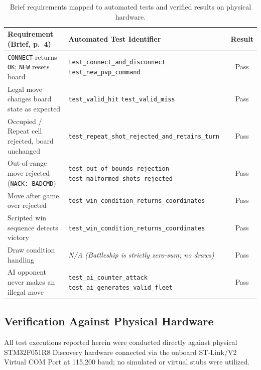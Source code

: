 \begin{table}[t]
\centering
\caption{Brief requirements mapped to automated tests and verified results on physical hardware.}
\label{tab:required}
\scriptsize
\begin{tabular}{@{}L{3.5cm}L{4.0cm}c@{}}
\toprule
\textbf{Requirement (Brief, p.~4)} & \textbf{Automated Test Identifier} & \textbf{Result} \\
\midrule
\texttt{CONNECT} returns \texttt{OK}; \texttt{NEW} resets board & \texttt{test\_connect\_}\allowbreak\texttt{and\_disconnect} \newline \texttt{test\_new\_pvp\_command} & Pass \\
\addlinespace[2pt]
Legal move changes board state as expected & \texttt{test\_valid\_hit} \newline \texttt{test\_valid\_miss} & Pass \\
\addlinespace[2pt]
Occupied / Repeat cell rejected, board unchanged & \texttt{test\_repeat\_shot\_}\allowbreak\texttt{rejected\_and\_retains\_turn} & Pass \\
\addlinespace[2pt]
Out-of-range move rejected (\texttt{NACK: BADCMD}) & \texttt{test\_out\_of\_bounds\_}\allowbreak\texttt{rejection} \newline \texttt{test\_malformed\_}\allowbreak\texttt{shots\_rejected} & Pass \\
\addlinespace[2pt]
Move after game over rejected & \texttt{test\_win\_condition\_}\allowbreak\texttt{returns\_coordinates} & Pass \\
\addlinespace[2pt]
Scripted win sequence detects victory & \texttt{test\_win\_condition\_}\allowbreak\texttt{returns\_coordinates} & Pass \\
\addlinespace[2pt]
Draw condition handling & \emph{N/A (Battleship is strictly zero-sum; no draws)} & Pass \\
\addlinespace[2pt]
AI opponent never makes an illegal move & \texttt{test\_ai\_counter\_attack} \newline \texttt{test\_ai\_generates\_}\allowbreak\texttt{valid\_fleet} & Pass \\
\bottomrule
\end{tabular}
\end{table}

\subsection{Verification Against Physical Hardware}
All test executions reported herein were conducted directly against physical STM32F051R8 Discovery hardware connected via the onboard ST-Link/V2 Virtual COM Port at 115,200 baud; no simulated or virtual stubs were utilized.

